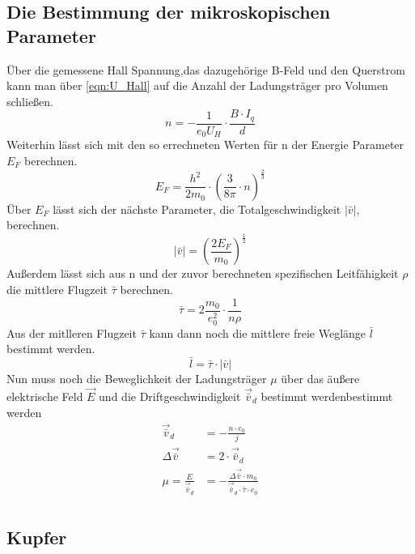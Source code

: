 \subsection{Die Bestimmung der mikroskopischen Parameter}
Über die gemessene Hall Spannung,das dazugehörige B-Feld und den Querstrom kann man über \ref{eqn:U_Hall} auf die Anzahl der Ladungsträger pro Volumen schließen.
\begin{equation*}
    n = -\frac{1}{e_0 U_H}\cdot \frac{B\cdot I_q}{d}
\end{equation*}
Weiterhin lässt sich mit den so errechneten Werten für n der Energie Parameter $E_F$ berechnen.
\begin{equation*}
    E_F = \frac{h^2}{2 m_0}\cdot \left(\frac{3}{8\pi}\cdot n \right)^{\frac{2}{3}}
\end{equation*}
Über $E_F$ lässt sich der nächste Parameter, die Totalgeschwindigkeit $|\bar{v}|$, berechnen.
\begin{equation*}
    |\bar{v}| = \left(\frac{2 E_F}{m_0}\right)^{\frac{1}{2}}
\end{equation*}
Außerdem lässt sich aus n und der zuvor berechneten spezifischen Leitfähigkeit $\rho$ die mittlere Flugzeit $\bar{\tau}$ berechnen.
\begin{equation*}
    \bar{\tau} = 2 \frac{m_0}{e_0^2} \cdot \frac{1}{n \rho}
\end{equation*}
Aus der mitlleren Flugzeit $\bar{\tau}$ kann dann noch die mittlere freie Weglänge $\bar{l}$ bestimmt werden.
\begin{equation*}
    \bar{l} = \bar{\tau} \cdot |\bar{v}|
\end{equation*}
Nun muss noch die Beweglichkeit der Ladungsträger $\mu$ über das äußere elektrische Feld $\vec{E}$ und die Driftgeschwindigkeit $\vec{\bar{v}}_d$ bestimmt werdenbestimmt werden
\begin{align*}
    \vec{\bar{v}}_d &= -\frac{n \cdot e_0}{j} \\
    \Delta \vec{\bar{v}} &= 2\cdot \vec{\bar{v}}_d\\
    \mu = \frac{E}{\vec{\bar{v}}_d} &= - \frac{\Delta \vec{\bar{v}}\cdot m_0 }{\vec{\bar{v}}_d \cdot \bar{\tau} \cdot e_0}\\
\end{align*}



\subsection{Kupfer}
